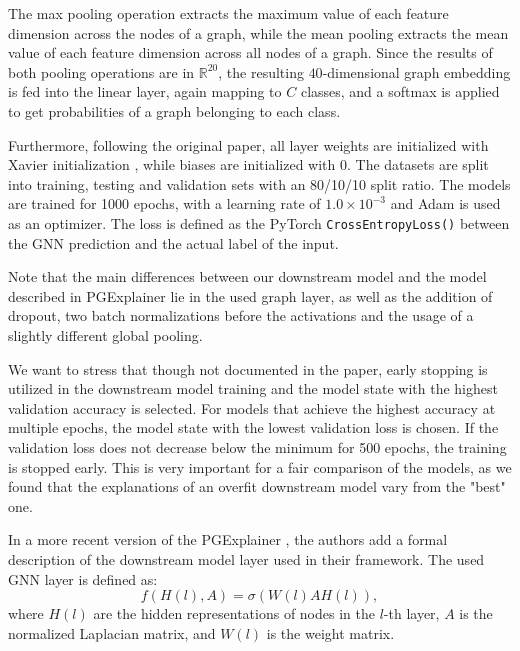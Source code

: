 The max pooling operation extracts the maximum value of each feature dimension across the nodes of a graph, while the mean pooling extracts the mean value of each feature dimension across all nodes of a graph. Since the results of both pooling operations are in $\mathbb{R}^{20}$, the resulting $40$-dimensional graph embedding is fed into the linear layer, again mapping to $C$ classes, and a softmax is applied to get probabilities of a graph belonging to each class.\bigskip



Furthermore, following the original paper, all layer weights are initialized with Xavier initialization \cite{glorot2010understanding}, while biases are initialized with $0$. The datasets are split into training, testing and validation sets with an 80/10/10 split ratio. The models are trained for 1000 epochs, with a learning rate of $1.0 \times 10^{-3}$ and Adam \cite{kingma2014adam} is used as an optimizer. The loss is defined as the PyTorch \lstinline|CrossEntropyLoss()| between the GNN prediction and the actual label of the input. \bigskip

Note that the main differences between our downstream model and the model described in PGExplainer \cite{luo2020parameterized} lie in the used graph layer, as well as the addition of dropout, two batch normalizations before the activations and the usage of a slightly different global pooling.

We want to stress that though not documented in the paper, early stopping is utilized in the downstream model training and the model state with the highest validation accuracy is selected. For models that achieve the highest accuracy at multiple epochs, the model state with the lowest validation loss is chosen. If the validation loss does not decrease below the minimum for 500 epochs, the training is stopped early. This is very important for a fair comparison of the models, as we found that the explanations of an overfit downstream model vary from the "best" one.\bigskip

In a more recent version of the PGExplainer \cite{10423141}, the authors add a formal description of the downstream model layer used in their framework. The used GNN layer is defined as:
\begin{equation}
    f(H(l),A)=\sigma(W(l)AH(l)),
\end{equation}
where $H(l)$ are the hidden representations of nodes in the $l$-th layer, $A$ is the normalized Laplacian matrix, and $W(l)$ is the weight matrix.

